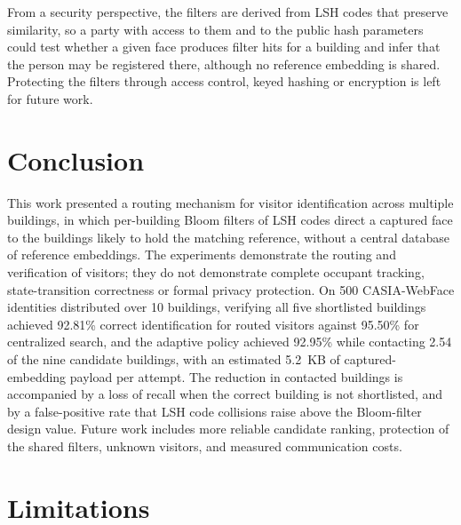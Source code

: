 \documentclass[pdflatex,sn-mathphys-num]{sn-jnl}%
\theoremstyle{thmstyleone}%
\theoremstyle{thmstyletwo}%
\theoremstyle{thmstylethree}%
\begin{document}
From a security perspective, the filters are derived from LSH codes that preserve similarity, so a party with access to them and to the public hash parameters could test whether a given face produces filter hits for a building and infer that the person may be registered there, although no reference embedding is shared. Protecting the filters through access control, keyed hashing or encryption is left for future work.


\section{Conclusion}
\label{sec:conclusion}

This work presented a routing mechanism for visitor identification across multiple buildings, in which per-building Bloom filters of LSH codes direct a captured face to the buildings likely to hold the matching reference, without a central database of reference embeddings. The experiments demonstrate the routing and verification of visitors; they do not demonstrate complete occupant tracking, state-transition correctness or formal privacy protection. On 500 CASIA-WebFace identities distributed over 10 buildings, verifying all five shortlisted buildings achieved 92.81\% correct identification for routed visitors against 95.50\% for centralized search, and the adaptive policy achieved 92.95\% while contacting 2.54 of the nine candidate buildings, with an estimated 5.2~KB of captured-embedding payload per attempt. The reduction in contacted buildings is accompanied by a loss of recall when the correct building is not shortlisted, and by a false-positive rate that LSH code collisions raise above the Bloom-filter design value. Future work includes more reliable candidate ranking, protection of the shared filters, unknown visitors, and measured communication costs.


\section{Limitations}
\label{sec:limitations}
\end{document}

